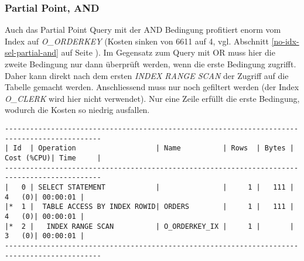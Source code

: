 \documentclass[11pt,a4paper,parskip=half]{scrartcl}
\begin{document}
\subsubsection{Partial Point, AND}
Auch das Partial Point Query mit der AND Bedingung profitiert enorm vom  Index auf \emph{O\_ORDERKEY} (Kosten sinken von 6611 auf 4, vgl. Abschnitt \ref{no-idx-sel-partial-and} auf Seite \pageref{no-idx-sel-partial-and}). Im Gegensatz zum Query mit OR muss hier die zweite Bedingung nur dann überprüft werden, wenn die erste Bedingung zugrifft. Daher kann direkt nach dem ersten \emph{INDEX RANGE SCAN} der Zugriff auf die Tabelle gemacht werden. Anschliessend muss nur noch gefiltert werden (der Index \emph{O\_CLERK} wird hier nicht verwendet). Nur eine Zeile erfüllt die erste Bedingung, wodurch die Kosten so niedrig ausfallen.
\begin{lstlisting}
---------------------------------------------------------------------------------------------                                                                                                                                                                                                                
| Id  | Operation                   | Name          | Rows  | Bytes | Cost (%CPU)| Time     |                                                                                                                                                                                                                
---------------------------------------------------------------------------------------------                                                                                                                                                                                                                
|   0 | SELECT STATEMENT            |               |     1 |   111 |     4   (0)| 00:00:01 |                                                                                                                                                                                                                
|*  1 |  TABLE ACCESS BY INDEX ROWID| ORDERS        |     1 |   111 |     4   (0)| 00:00:01 |                                                                                                                                                                                                                
|*  2 |   INDEX RANGE SCAN          | O_ORDERKEY_IX |     1 |       |     3   (0)| 00:00:01 |                                                                                                                                                                                                                
---------------------------------------------------------------------------------------------                                                                                                                                                                                                                
                                                                                                                                                                                                                                                                                                             

\end{lstlisting}
\end{document}

